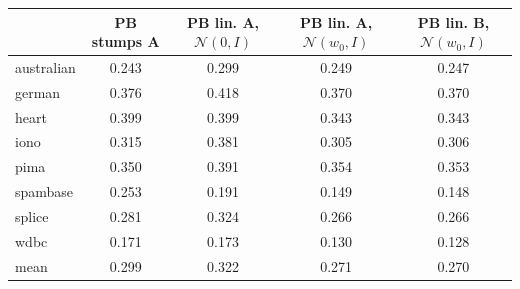 \begin{tabular}{lcccc}
\toprule
 & PB stumps A & PB lin. A, $\mathcal{N}(0,I)$ & PB lin. A, $\mathcal{N}(w_0,I)$ & PB lin. B, $\mathcal{N}(w_0,I)$ \\
\midrule
australian & 0.243 & 0.299 & 0.249 & 0.247 \\
german & 0.376 & 0.418 & 0.370 & 0.370 \\
heart & 0.399 & 0.399 & 0.343 & 0.343 \\
iono & 0.315 & 0.381 & 0.305 & 0.306 \\
pima & 0.350 & 0.391 & 0.354 & 0.353 \\
spambase & 0.253 & 0.191 & 0.149 & 0.148 \\
splice & 0.281 & 0.324 & 0.266 & 0.266 \\
wdbc & 0.171 & 0.173 & 0.130 & 0.128 \\
mean & 0.299 & 0.322 & 0.271 & 0.270 \\
\bottomrule
\end{tabular}
